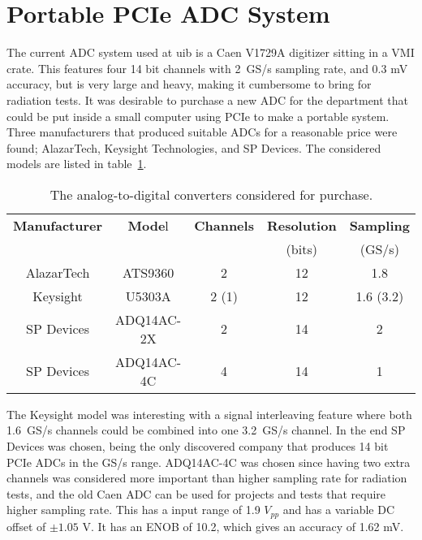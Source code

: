 \documentclass[../main/thesis.tex]{subfiles}
\begin{document}

\section{Portable PCIe ADC System}
\label{e-adc}
The current \gls{ADC} system used at \gls{uib} is a Caen V1729A digitizer sitting in a VMI crate. This features four 14 bit channels with 2~GS/s sampling rate, and 0.3 mV accuracy, but is very large and heavy, making it cumbersome to bring for radiation tests. It was desirable to purchase a new \gls{ADC} for the department that could be put inside a small computer using \gls{PCIe} to make a portable system. Three manufacturers that produced suitable \gls{ADC}s for a reasonable price were found; AlazarTech, Keysight Technologies, and SP Devices. The considered models are listed in table~\ref{tab-adc}. 

\begin{table}[h]
\begin{center}
	\caption{The analog-to-digital converters considered for purchase.}
	\label{tab-adc}
	\begin{tabular}{ccccc}%
		\toprule %
		\textbf{Manufacturer} & \textbf{Mode}l & \textbf{Channels} & \textbf{Resolution} & \textbf{Sampling} \\ 
		 & & & (bits) & (GS/s) \\ \midrule%
		AlazarTech & ATS9360 & 2 & 12 & 1.8 \\ %
		Keysight & U5303A & 2 (1) & 12 & 1.6 (3.2) \\ %
		SP Devices & ADQ14AC-2X & 2 & 14 & 2 \\ %
		SP Devices & ADQ14AC-4C & 4 & 14 & 1 \\ \bottomrule%
	\end{tabular}
\end{center}
\end{table}

The Keysight model was interesting with a signal interleaving feature where both 1.6~GS/s channels could be combined into one 3.2~GS/s channel. In the end SP Devices was chosen, being the only discovered company that produces 14 bit \gls{PCIe} \gls{ADC}s in the GS/s range. ADQ14AC-4C was chosen since having two extra channels was considered more important than higher sampling rate for radiation tests, and the old Caen \gls{ADC} can be used for projects and tests that require higher sampling rate. This has a input range of 1.9 $V_{pp}$ and has a variable DC offset of $\pm1.05$ V. It has an \gls{ENOB} of 10.2, which gives an accuracy of 1.62 mV. 
\end{document}
